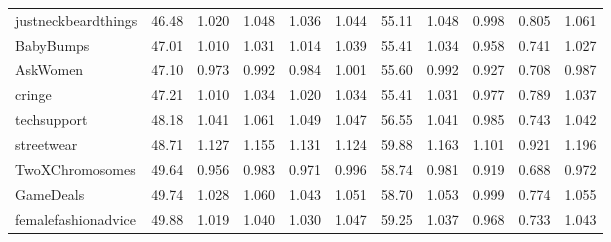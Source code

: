 \begin{tabular}{lrrrrrrrrrr}
justneckbeardthings &         46.48 &               1.020 &               1.048 &               1.036 &               1.044 &                55.11 &                      1.048 &                      0.998 &                      0.805 &                      1.061 \\
BabyBumps           &         47.01 &               1.010 &               1.031 &               1.014 &               1.039 &                55.41 &                      1.034 &                      0.958 &                      0.741 &                      1.027 \\
AskWomen            &         47.10 &               0.973 &               0.992 &               0.984 &               1.001 &                55.60 &                      0.992 &                      0.927 &                      0.708 &                      0.987 \\
cringe              &         47.21 &               1.010 &               1.034 &               1.020 &               1.034 &                55.41 &                      1.031 &                      0.977 &                      0.789 &                      1.037 \\
techsupport         &         48.18 &               1.041 &               1.061 &               1.049 &               1.047 &                56.55 &                      1.041 &                      0.985 &                      0.743 &                      1.042 \\
streetwear          &         48.71 &               1.127 &               1.155 &               1.131 &               1.124 &                59.88 &                      1.163 &                      1.101 &                      0.921 &                      1.196 \\
TwoXChromosomes     &         49.64 &               0.956 &               0.983 &               0.971 &               0.996 &                58.74 &                      0.981 &                      0.919 &                      0.688 &                      0.972 \\
GameDeals           &         49.74 &               1.028 &               1.060 &               1.043 &               1.051 &                58.70 &                      1.053 &                      0.999 &                      0.774 &                      1.055 \\
femalefashionadvice &         49.88 &               1.019 &               1.040 &               1.030 &               1.047 &                59.25 &                      1.037 &                      0.968 &                      0.733 &                      1.043 \\

\end{tabular}
